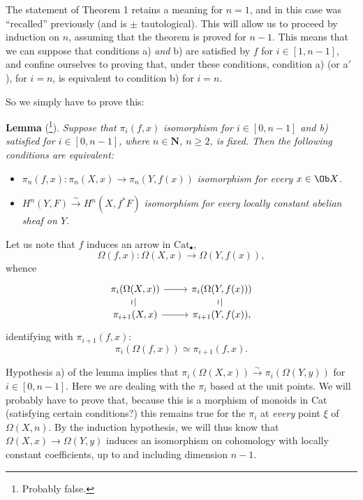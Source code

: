 The statement of Theorem 1 retains a meaning for $n = 1$, and in this case was ``recalled'' previously (and is $\pm$ tautological). This will allow us to proceed by induction on $n$, assuming that the theorem is proved for $n-1$. This means that we can suppose that conditions a) \textit{and} b) are satisfied by $f$ for $i \in [1,n-1]$, and confine ourselves to proving that, under these conditions, condition a) (or a$'$), for $i = n$, is equivalent to condition b) for $i = n$.


So we simply have to prove this:

\textbf{Lemma} (\footnote[115]{Probably false.}). \textit{Suppose that $\pi_i(f,x)$} \textit{isomorphism for $i \in [0,n-1]$ and b) satisfied for $i \in [0,n-1]$, where $n \in \mathbf{N}$, $n \geq 2$, is fixed. Then the following conditions are equivalent:}

\begin{itemize}
\item[\textit{a)}] $\pi_n(f,x) : \pi_n(X,x) \longrightarrow \pi_n(Y,f(x))$ \textit{isomorphism for every $x \in \Ob X$.}

\item[\textit{b)}] $H^n(Y,F) \xrightarrow{\sim} H^n(X,f^*F)$ \textit{isomorphism for every locally constant abelian sheaf on $Y$.}
\end{itemize}

Let us note that $f$ induces an arrow in $\mathrm{Cat}_\bullet$,
\[
\Omega(f,x) : \Omega(X,x) \longrightarrow \Omega(Y,f(x)),
\]
whence
\[
\begin{tikzcd}[row sep=small]
\pi_i(\Omega(X,x)) \arrow[r] \arrow[d, dash, "\wr"'] & \pi_i(\Omega(Y,f(x))) \arrow[d, dash, "\wr"'] \\
\pi_{i+1}(X,x) \arrow[r] & \pi_{i+1}(Y,f(x)),
\end{tikzcd}
\]
identifying with $\pi_{i+1}(f,x)$:
\[
\pi_i(\Omega(f,x)) \simeq \pi_{i+1}(f,x).
\]



Hypothesis a) of the lemma implies that $\pi_i(\Omega(X,x)) \xrightarrow{\sim} \pi_i(\Omega(Y,y))$ for $i \in [0,n-1]$. Here we are dealing with the $\pi_i$ based at the unit points. We will probably have to prove that, because this is a morphism of monoids in Cat (satisfying certain conditions?) this remains true for the $\pi_i$ at \textit{every} point $\xi$ of $\Omega(X,n)$. By the induction hypothesis, we will thus know that $\Omega(X,x) \longrightarrow \Omega(Y,y)$ %
induces an isomorphism on cohomology with locally constant coefficients, up to and including dimension $n-1$.

